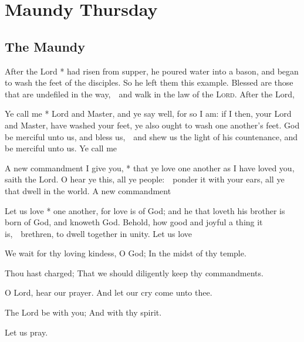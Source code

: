 \section{Maundy Thursday}

\subsection{The Maundy}
\ant After the Lord * had risen from supper, he poured water into a bason, and began to wash the feet of the disciples. So he left them this example.  Blessed are those that are undefiled in the way,\ \star\ and walk in the law of the {\scshape Lord}.  After the Lord, \etc

\ant Ye call me * Lord and Master, and ye say well, for so I am: if I then, your Lord and Master, have washed your feet, ye also ought to wash one another’s feet.  God be merciful unto us, and bless us,\ \star\ and shew us the light of his countenance, and be merciful unto us.  Ye call me \etc

\ant A new commandment I give you, * that ye love one another as I have loved you, saith the Lord.  O hear ye this, all ye people:\ \star\ ponder it with your ears, all ye that dwell in the world.  A new commandment \etc

\ant Let us love * one another, for love is of God; and he that loveth his brother is born of God, and knoweth God.  Behold, how good and joyful a thing it is,\ \star\ brethren, to dwell together in unity.  Let us love \etc

\medskip
\V We wait for thy loving kindess, O God; \R In the midst of thy temple.

\V Thou hast charged; \R That we should diligently keep thy commandments.

\V O Lord, hear our prayer.  \R And let our cry come unto thee.

\V The Lord be with you; \R And with thy spirit.

\centerline{Let us pray.}

